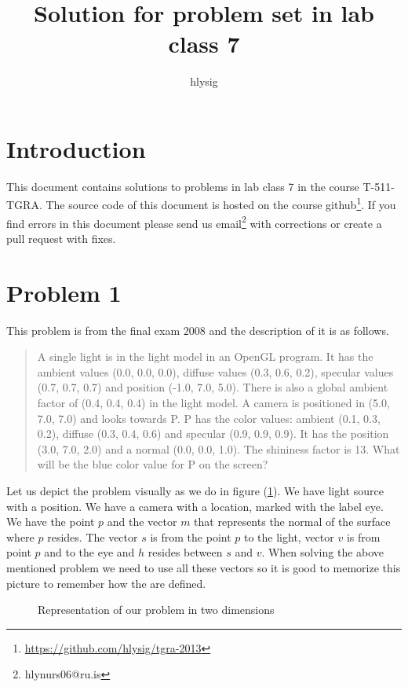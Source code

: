 \documentclass[12pt]{article}
\title{\textbf{Solution for problem set in lab class 7}}
\author{hlysig}
\date{}
\begin{document}
\maketitle
\section*{Introduction}
This document contains solutions to problems in lab class 7 in the course
T-511-TGRA.  The source code of this document is hosted on the course
github\footnote{\url{https://github.com/hlysig/tgra-2013}}. If you find errors
in this document please send us email\footnote{hlynurs06@ru.is} with corrections
or create a pull request with fixes.

\section*{Problem 1}
This problem is from the final exam 2008 and the description of it is as
follows.
\begin{quote}
A single light is in the light model in an OpenGL program. It has the ambient
values (0.0, 0.0, 0.0), diffuse values (0.3, 0.6, 0.2), specular values (0.7,
0.7, 0.7) and position (-1.0, 7.0, 5.0). There is also a global ambient factor
of (0.4, 0.4, 0.4) in the light model. A camera is positioned in (5.0, 7.0,
7.0) and looks towards P. P has the color values: ambient (0.1, 0.3, 0.2),
diffuse (0.3, 0.4, 0.6) and specular (0.9, 0.9, 0.9). It has the position (3.0,
7.0, 2.0) and a normal (0.0, 0.0, 1.0). The shininess factor is 13.
What will be the blue color value for P on the screen?
\end{quote}

Let us depict the problem visually as we do in figure (\ref{fig:vectors}). We
have light source with a position. We have a camera with a location, marked
with the label eye. We have the point $p$ and the vector $m$ that
represents the normal of the surface where $p$ resides. The vector $s$ is
from the point $p$ to the light, vector $v$ is from point $p$ and to the eye
and $h$ resides between $s$ and $v$. When solving the above mentioned problem
we need to use all these vectors so it is good to memorize this picture to
remember how the are defined.

\begin{figure}[h!]
\center
{}
\caption{Representation of our problem in two dimensions}
\label{fig:vectors}
\end{figure}
\end{document}
